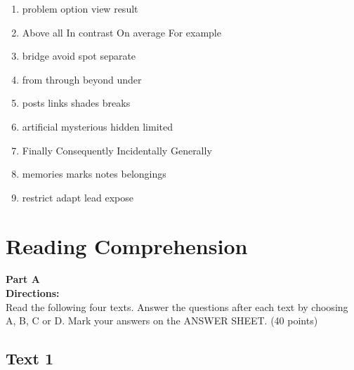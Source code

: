\begin{enumerate}
\item

\fourchoices
{problem}
{option}
{view}
{result}



\item

\fourchoices
{Above all}
{In contrast}
{On average}
{For example}



\item

\fourchoices
{bridge}
{avoid}
{spot}
{separate}



\item

\fourchoices
{from}
{through}
{beyond}
{under}


\item

\fourchoices
{posts}
{links}
{shades}
{breaks}


\item
\fourchoices
{artificial}
{mysterious}
{hidden}
{limited}


\item
\fourchoices
{Finally}
{Consequently}
{Incidentally}
{Generally}


\item

\fourchoices
{memories}
{marks}
{notes}
{belongings}


\item

\fourchoices
{restrict}
{adapt}
{lead}
{expose}

\end{enumerate}


\vfil

\section{Reading Comprehension}

\noindent
\textbf{Part A}\\
\textbf{Directions:}\\
 Read the following four texts. Answer the questions
after each text by choosing A, B, C or
D. Mark your answers on the
ANSWER SHEET. (40 points)

\newpage

\subsection{Text 1}

